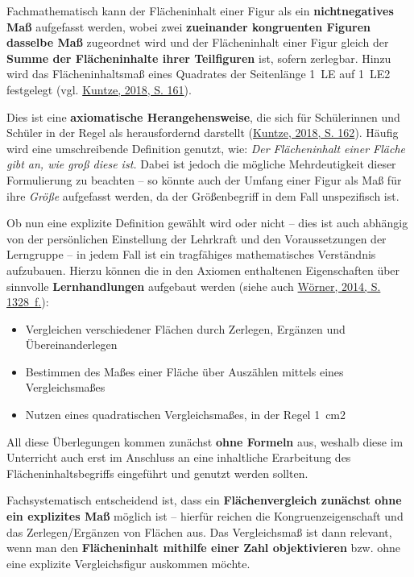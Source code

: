 \documentclass[
  ngerman,
]{scrbook}
\providecommand{\tightlist}{%
  \setlength{\itemsep}{0pt}\setlength{\parskip}{0pt}}
\theoremstyle{definition}
\theoremstyle{definition}
\theoremstyle{definition}
\theoremstyle{definition}
\theoremstyle{remark}
\begin{document}
Fachmathematisch kann der Flächeninhalt einer Figur als ein \textbf{nichtnegatives Maß} aufgefasst werden, wobei zwei \textbf{zueinander kongruenten Figuren dasselbe Maß} zugeordnet wird und der Flächeninhalt einer Figur gleich der \textbf{Summe der Flächeninhalte ihrer Teilfiguren} ist, sofern zerlegbar. Hinzu wird das Flächeninhaltsmaß eines Quadrates der Seitenlänge 1~LE auf 1~LE2 festgelegt (vgl. \protect\hyperlink{ref-Kuntze2018}{Kuntze, 2018, S. 161}).

Dies ist eine \textbf{axiomatische Herangehensweise}, die sich für Schülerinnen und Schüler in der Regel als herausfordernd darstellt (\protect\hyperlink{ref-Kuntze2018}{Kuntze, 2018, S. 162}). Häufig wird eine umschreibende Definition genutzt, wie: \emph{Der Flächeninhalt einer Fläche gibt an, wie groß diese ist.} Dabei ist jedoch die mögliche Mehrdeutigkeit dieser Formulierung zu beachten -- so könnte auch der Umfang einer Figur als Maß für ihre \emph{Größe} aufgefasst werden, da der Größenbegriff in dem Fall unspezifisch ist.

Ob nun eine explizite Definition gewählt wird oder nicht -- dies ist auch abhängig von der persönlichen Einstellung der Lehrkraft und den Voraussetzungen der Lerngruppe -- in jedem Fall ist ein tragfähiges mathematisches Verständnis aufzubauen. Hierzu können die in den Axiomen enthaltenen Eigenschaften über sinnvolle \textbf{Lernhandlungen} aufgebaut werden (siehe auch \protect\hyperlink{ref-Worner2014}{Wörner, 2014, S. 1328~f.}):

\begin{itemize}
\tightlist
\item
  Vergleichen verschiedener Flächen durch Zerlegen, Ergänzen und Übereinanderlegen
\item
  Bestimmen des Maßes einer Fläche über Auszählen mittels eines Vergleichsmaßes
\item
  Nutzen eines quadratischen Vergleichsmaßes, in der Regel 1~cm2
\end{itemize}

All diese Überlegungen kommen zunächst \textbf{ohne Formeln} aus, weshalb diese im Unterricht auch erst im Anschluss an eine inhaltliche Erarbeitung des Flächeninhaltsbegriffs eingeführt und genutzt werden sollten.

Fachsystematisch entscheidend ist, dass ein \textbf{Flächenvergleich zunächst ohne ein explizites Maß} möglich ist -- hierfür reichen die Kongruenzeigenschaft und das Zerlegen/Ergänzen von Flächen aus. Das Vergleichsmaß ist dann relevant, wenn man den \textbf{Flächeninhalt mithilfe einer Zahl objektivieren} bzw. ohne eine explizite Vergleichsfigur auskommen möchte.
\end{document}
